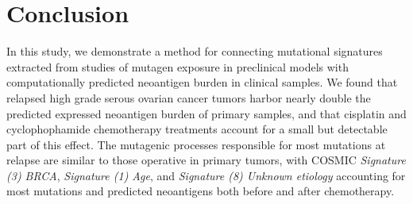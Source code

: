 \section*{Conclusion}
In this study, we demonstrate a method for connecting mutational signatures extracted from studies of mutagen exposure in preclinical models with computationally predicted neoantigen burden in clinical samples. We found that relapsed high grade serous ovarian cancer tumors harbor nearly double the predicted expressed neoantigen burden of primary samples, and that cisplatin and cyclophophamide chemotherapy treatments account for a small but detectable part of this effect. The mutagenic processes responsible for most mutations at relapse are similar to those operative in primary tumors, with COSMIC \textit{Signature (3) BRCA}, \textit{Signature (1) Age}, and \textit{Signature (8) Unknown etiology} accounting for most mutations and predicted neoantigens both before and after chemotherapy.